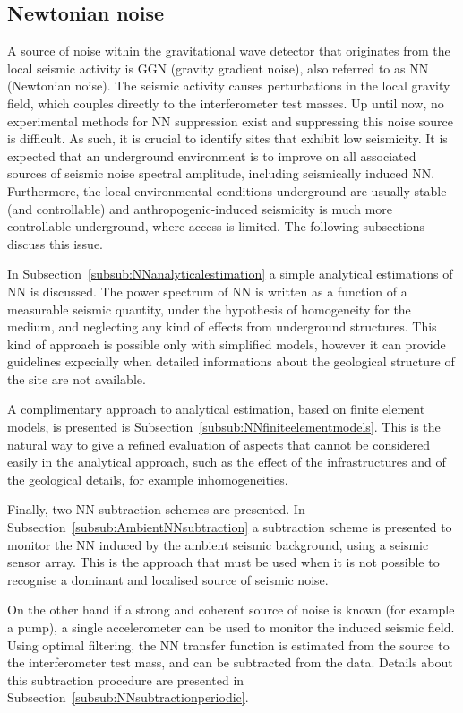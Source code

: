 \FloatBarrier
\subsection{Newtonian noise}
\label{NewtonianNoise}
A source of noise within the gravitational wave detector that originates from
the local seismic activity is GGN (gravity gradient noise), also referred to as NN
(Newtonian noise). The seismic activity causes perturbations in the local
gravity field, which couples directly to the interferometer test masses. Up
until now, no experimental methods for NN suppression exist and suppressing
this noise source is difficult. As such, it is crucial to identify sites that
exhibit low seismicity. It is expected that an underground environment is to
improve on all associated sources of seismic noise spectral amplitude,
including seismically induced NN. Furthermore, the local environmental
conditions underground are usually stable (and controllable) and
anthropogenic-induced seismicity is much more controllable underground, where
access is limited. The following subsections discuss this issue.

In Subsection~\ref{subsub:NNanalyticalestimation} a simple analytical
estimations of NN is discussed. The power spectrum of NN is written as a
function of a measurable seismic quantity, under the hypothesis of homogeneity
for the medium, and neglecting any kind of effects from underground
structures.  This kind of approach is possible only with simplified models,
however it can provide guidelines expecially when detailed informations about
the geological structure of the site are not available.

A complimentary approach to analytical estimation, based on finite element
models, is presented is Subsection~\ref{subsub:NNfiniteelementmodels}. This is
the natural way to give a refined evaluation of aspects that cannot be
considered easily in the analytical approach, such as the effect of the
infrastructures and of the geological details, for example inhomogeneities.

Finally, two NN subtraction schemes are presented. In Subsection~\ref{subsub:AmbientNNsubtraction} a subtraction scheme is presented to monitor the NN induced by the ambient seismic background, using a seismic sensor array. This is the approach that must be used when it is not possible to recognise a dominant and localised source of seismic noise.

On the other hand if a strong and coherent source of noise is known (for example a pump), a single accelerometer can be used to monitor the induced seismic field. Using optimal filtering, the NN transfer function is estimated from the source to the interferometer test mass, and can be subtracted from the data. Details about this subtraction procedure are presented in Subsection~\ref{subsub:NNsubtractionperiodic}.

